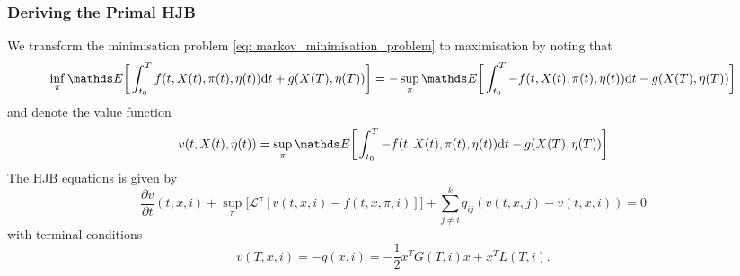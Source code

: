 \subsubsection{Deriving the Primal HJB}
We transform the minimisation problem \eqref{eq: markov_minimisation_problem} to maximisation by noting that
\begin{equation*}
    \inf_{\pi} \E \bigg[ \int_{t_0}^T f(t, X(t), \pi(t), \eta(t)) \d t + g(X(T), \eta(T)) \bigg] = - \sup_{\pi} \E \bigg[ \int_{t_0}^T -f(t, X(t), \pi(t), \eta(t)) \d t - g(X(T), \eta(T)) \bigg]
\end{equation*}
and denote the value function
\begin{equation}
    v(t, X(t), \eta(t)) = \sup_{\pi} \E \bigg[ \int_{t_0}^T -f(t, X(t), \pi(t), \eta(t)) \d t - g(X(T), \eta(T)) \bigg]
\end{equation}
The HJB equations is given by
\begin{equation}
    \frac{\partial v}{\partial t} (t,x, i) + \sup_{\pi} \big[ \mathcal{L}^\pi[v(t,x,i) - f(t, x, \pi, i)] \big] + \sum_{j \ne i}^k q_{ij} (v(t,x,j) - v(t,x,i)) = 0 \label{eq: markov_hjb}
\end{equation}
with terminal conditions
\begin{equation*}
    v(T, x, i) = - g(x, i) = - \frac{1}{2} x^T G(T, i) x + x^T L(T, i).
\end{equation*}
